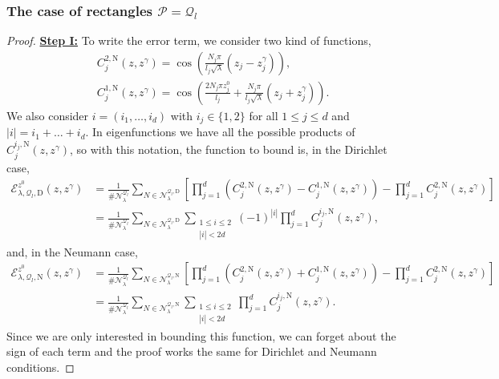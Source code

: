 \documentclass{amsart}
\theoremstyle{definition}
\theoremstyle{remark}
\renewcommand\leq\leqslant
\numberwithin{equation}{section}
\theoremstyle{definition}
\theoremstyle{remark}
\begin{document}
\subsubsection{The case of rectangles $\mathcal{P}=\mathcal{Q}_l$}\label{QlNF}
\begin{proof}
	
\textbf{	\underline{Step I:}}
	To write the error term, we consider two kind of functions,\begin{equation}
		\begin{aligned}
			&C_j^{2,\mathrm{N}}(z,z^\gamma)=\cos\left(\frac{N_j\pi}{l_j\sqrt{\lambda}}(z_j-z^\gamma_j)\right),\\
			&C_j^{1,\mathrm{N}}(z,z^\gamma)=\cos\left(\frac{2N_j\pi z^0_j}{l_j}+\frac{N_j\pi }{l_j\sqrt{\lambda}}(z_j+z^\gamma_j)\right).
		\end{aligned}
	\end{equation}We also consider $i=(i_1,\ldots,i_d)$ with $i_j\in\{1,2\}$ for all $1\leq j\leq d$ and $|i|=i_1+\ldots+i_d$. In eigenfunctions we have all the possible products of $C_j^{i_j,\mathrm{N}}(z,z^\gamma)$, so with this notation, the function to bound is, in the Dirichlet case,
	\begin{equation}\label{DE}
		\begin{aligned}
			\mathcal{E}_{\lambda,\mathcal{Q}_l,\mathrm{D}}^{z^0}(z,z^\gamma)&=\frac{1}{\#\mathcal{N}_\lambda^{\mathcal{Q}_l}}\sum_{N\in\mathcal{N}_\lambda^{\mathcal{Q}_l,\mathrm{D}}}\left[\prod_{j=1}^d\left(C_j^{2,\mathrm{N}}(z,z^\gamma)-C_j^{1,\mathrm{N}}(z,z^\gamma)\right)-\prod_{j=1}^dC_j^{2,\mathrm{N}}(z,z^\gamma)\right]\\
			&=\frac{1}{\#\mathcal{N}_\lambda^{\mathcal{Q}_l}}\sum_{N\in\mathcal{N}_\lambda^{\mathcal{Q}_l,\mathrm{D}}}\sum_{\substack{1\leq i\leq 2\\|i|<2d}}(-1)^{|i|}\prod_{j=1}^dC_j^{i_j,\mathrm{N}}(z,z^\gamma),
		\end{aligned}
	\end{equation}and, in the Neumann case, 
	\begin{equation}\label{NE}
		\begin{aligned}
			\mathcal{E}_{\lambda,\mathcal{Q}_l,\mathrm{N}}^{z^0}(z,z^\gamma)&=\frac{1}{\#\mathcal{N}_\lambda^{\mathcal{Q}_l}}\sum_{N\in\mathcal{N}_\lambda^{\mathcal{Q}_l,\mathrm{N}}}\left[\prod_{j=1}^d\left(C_j^{2,\mathrm{N}}(z,z^\gamma)+C_j^{1,\mathrm{N}}(z,z^\gamma)\right)-\prod_{j=1}^dC_j^{2,\mathrm{N}}(z,z^\gamma)\right]\\
			&=\frac{1}{\#\mathcal{N}_\lambda^{\mathcal{Q}_l}}\sum_{N\in\mathcal{N}_\lambda^{\mathcal{Q}_l,\mathrm{N}}}\sum_{\substack{1\leq i\leq 2\\|i|<2d}}\prod_{j=1}^dC_j^{i_j,\mathrm{N}}(z,z^\gamma).
		\end{aligned}
	\end{equation} 
	Since we are only interested in bounding this function, we can forget about the sign of each term and the proof works the same for Dirichlet and Neumann conditions.
	

\end{proof}
\end{document}
